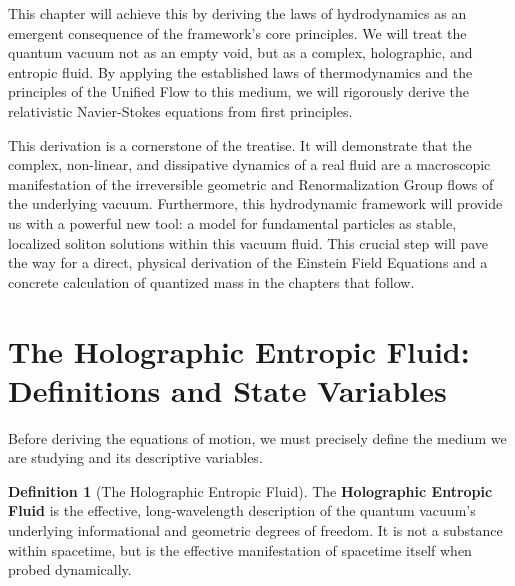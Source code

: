 \documentclass[11pt, letterpaper]{report}
\theoremstyle{plain} %
\theoremstyle{definition} %
\newtheorem{definition}{Definition}[chapter]
\theoremstyle{remark} %
\begin{document}
This chapter will achieve this by deriving the laws of hydrodynamics as an emergent consequence of the framework's core principles. We will treat the quantum vacuum not as an empty void, but as a complex, holographic, and entropic fluid. By applying the established laws of thermodynamics and the principles of the Unified Flow to this medium, we will rigorously derive the relativistic Navier-Stokes equations from first principles.

This derivation is a cornerstone of the treatise. It will demonstrate that the complex, non-linear, and dissipative dynamics of a real fluid are a macroscopic manifestation of the irreversible geometric and Renormalization Group flows of the underlying vacuum. Furthermore, this hydrodynamic framework will provide us with a powerful new tool: a model for fundamental particles as stable, localized soliton solutions within this vacuum fluid. This crucial step will pave the way for a direct, physical derivation of the Einstein Field Equations and a concrete calculation of quantized mass in the chapters that follow.

\section{The Holographic Entropic Fluid: Definitions and State Variables}
\label{sec:hydro_definitions}

Before deriving the equations of motion, we must precisely define the medium we are studying and its descriptive variables.

\begin{definition}[The Holographic Entropic Fluid]
The \textbf{Holographic Entropic Fluid} is the effective, long-wavelength description of the quantum vacuum's underlying informational and geometric degrees of freedom. It is not a substance within spacetime, but is the effective manifestation of spacetime itself when probed dynamically.
\end{definition}
\end{document}
